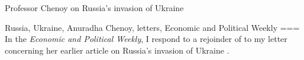 Professor Chenoy on Russia’s invasion of Ukraine

Russia, Ukraine, Anuradha Chenoy, letters, Economic and Political Weekly
===
In the \emph{Economic and Political Weekly}, I respond \parencite{loo2023a} to a rejoinder of \textcite{chenoy2023a} to my letter \parencite{loo2023} concerning her earlier article on Russia’s invasion of Ukraine \parencite{chenoy2023}.